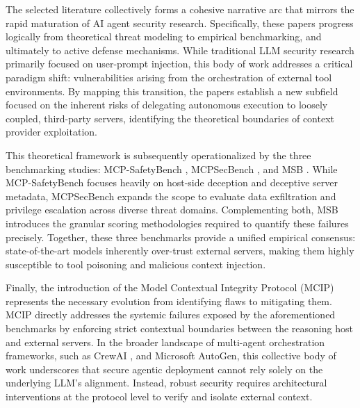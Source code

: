 

The selected literature collectively forms a cohesive narrative arc that mirrors the rapid maturation of AI agent security research. Specifically, these papers progress logically from theoretical threat modeling to empirical benchmarking, and ultimately to active defense mechanisms. While traditional LLM security research primarily focused on user-prompt injection, this body of work addresses a critical paradigm shift: vulnerabilities arising from the orchestration of external tool environments. By mapping this transition, the papers establish a new subfield focused on the inherent risks of delegating autonomous execution to loosely coupled, third-party servers, identifying the theoretical boundaries of context provider exploitation.

This theoretical framework is subsequently operationalized by the three benchmarking studies: MCP-SafetyBench \cite{zhang2025msb}, MCPSecBench \cite{yang2025mcpsecbench}, and MSB \cite{zhang2025msb}. While MCP-SafetyBench focuses heavily on host-side deception and deceptive server metadata, MCPSecBench expands the scope to evaluate data exfiltration and privilege escalation across diverse threat domains. Complementing both, MSB introduces the granular scoring methodologies required to quantify these failures precisely. Together, these three benchmarks provide a unified empirical consensus: state-of-the-art models inherently over-trust external servers, making them highly susceptible to tool poisoning and malicious context injection.

Finally, the introduction of the Model Contextual Integrity Protocol (MCIP)\cite{jing2025mcip} represents the necessary evolution from identifying flaws to mitigating them. MCIP directly addresses the systemic failures exposed by the aforementioned benchmarks by enforcing strict contextual boundaries between the reasoning host and external servers. In the broader landscape of multi-agent orchestration frameworks, such as CrewAI \cite{venkadesh2024crewai}, and Microsoft AutoGen\cite{wu2024autogen}, this collective body of work underscores that secure agentic deployment cannot rely solely on the underlying LLM's alignment. Instead, robust security requires architectural interventions at the protocol level to verify and isolate external context.
